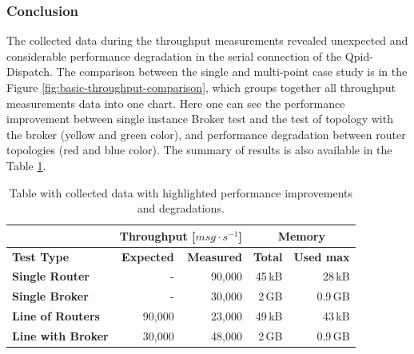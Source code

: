 \subsubsection*{Conclusion}
The collected data during the throughput measurements revealed unexpected and considerable performance degradation in the serial connection of the Qpid-Dispatch. The comparison between the single and multi-point case study is in the Figure \ref{fig:basic-throughput-comparison}, which groups together all throughput measurements data into one chart. Here one can see the performance improvement between single instance Broker test and the test of topology with the broker (yellow and green color), and performance degradation between router topologies (red and blue color). The summary of results is also available in the Table \ref{tab:throughput-summary}.

\begingroup
\setlength{\tabcolsep}{10pt} %
\renewcommand{\arraystretch}{1.35} %
	\begin{table}[h]
	\centering
	\begin{tabular}{|l|r|r|r|r|}
	\hline
	\rowcolor[HTML]{C5E3DF}
	 & \multicolumn{2}{c|}{\textbf{Throughput [$msg \cdot s^{-1}$]}} & \multicolumn{2}{c|}{\textbf{Memory}} \\ \hline
	\rowcolor[HTML]{C5E3DF}
	\textbf{Test Type} & \textbf{Expected} & \textbf{Measured} & \textbf{Total} & \textbf{Used max} \\ \hline
	\textbf{Single Router} & - & 90,000 & 45\,kB & 28\,kB \\ \hline
	\textbf{Single Broker} & - & 30,000 & 2\,GB & 0.9\,GB \\ \hline
	\textbf{Line of Routers} & 90,000 & \cellcolor[HTML]{FFCCC9}23,000 & 49\,kB & 43\,kB \\ \hline
	\textbf{Line with Broker} & 30,000 & \cellcolor[HTML]{9AFF99}48,000 & 2\,GB & 0.9\,GB \\ \hline
	\end{tabular}
	\caption{Table with collected data with highlighted performance improvements and degradations.}
	\label{tab:throughput-summary}
	\end{table}
\endgroup

